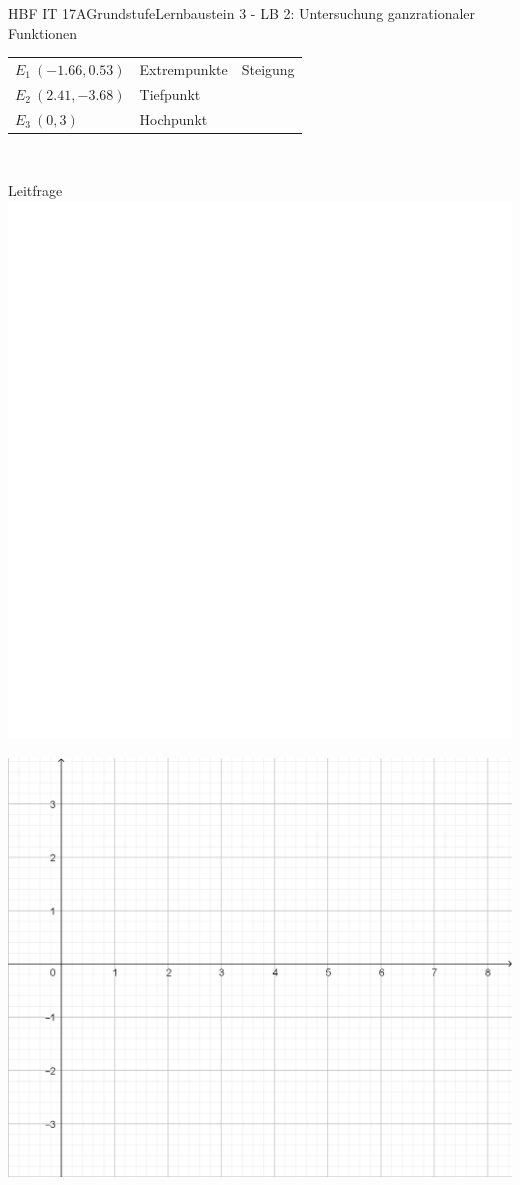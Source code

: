 \documentclass[oneside,openany,headings=optiontotoc,11pt,numbers=noenddot]{scrreprt}
\begin{document}
\begin{worksheet}{HBF IT 17A}{Grundstufe}{Lernbaustein 3 - LB 2: Untersuchung ganzrationaler Funktionen}
		\begin{framed}
			\noindent
			\begin{tabularx}{\textwidth}{XXX}
				\(E_1\ (-1.66,0.53)\) & Extrempunkte & Steigung\\
				\(E_2\ (2.41,-3.68)\) & Tiefpunkt & \\
				\(E_3\ (0,3)\) & Hochpunkt\\
				\hline
			\end{tabularx}\\
			\par\noindent
			\tiny{\color{codegray}Leitfrage}\\
			\includegraphics[scale=0.15]{../empty.jpg}
		\end{framed}
		\newpage
		\begin{framed}
			\noindent
			\centering
			\includegraphics[scale=0.6]{Bilder/Koord_g.png}

\end{framed}
\end{worksheet}
\end{document}
